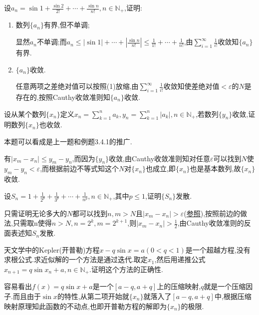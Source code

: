 \documentclass[cn,chinese,fontset]{elegantbook}
\begin{document}
      \begin{exercise}
          设$a_n=\sin1+\frac{\sin2}{2!}+\cdots+\frac{\sin n}{n!},n\in \mathbb{N}_+$,证明:
          \begin{enumerate}
              \item 数列$\{a_n\}$有界,但不单调;
                    \begin{solution}
                        显然$a_n$不单调;而$a_n\leqslant\left|\sin1\right|+\cdots+\left|\frac{\sin n}{n!}\right|\leqslant\frac{1}{1!}+\cdots+\frac{1}{n!}$,由$\sum_{i=1}^\infty\frac{1}{i!}$收敛知$\{a_n\}$有界.
                    \end{solution}\item $\{a_n\}$收敛.
                    \begin{solution}
                        任意两项之差绝对值可以按照(1)放缩,由$\sum_{i=1}^\infty\frac{1}{i!}$收敛知使差绝对值$<\varepsilon$的$N$是存在的,按照Cauthy收敛准则知$\{a_n\}$收敛.
                    \end{solution}
          \end{enumerate}
      \end{exercise}

      \begin{exercise}
          设从某个数列$\{x_n\}$定义$x_n=\sum_{k=1}^na_k,y_n=\sum_{k=1}^n\left|a_k\right|,n\in \mathbb{N}_+$,若数列$\{y_n\}$收敛,证明数列$\{x_n\}$也收敛.
          \begin{note}
              本题可以看成是上一题和例题3.4.1的推广.
          \end{note}
      \end{exercise}
      \begin{solution}
          有$\left|x_m-x_n\right|\leqslant y_m-y_n$,而因为$\{y_n\}$收敛,由Cauthy收敛准则知对任意$\varepsilon$可以找到$N$使$y_m-y_n<\varepsilon$,而根据前边不等式知这个$N$对$\{x_n\}$也成立,即$\{x_n\}$也是基本数列,故$\{x_n\}$收敛.
      \end{solution}

      \begin{exercise}
          设$S_n=1+\frac{1}{2^p}+\frac{1}{3^p}+\cdots+\frac{1}{n^p},n\in \mathbb{N}_+$,其中$p\leqslant 1$,证明$\{S_n\}$发散.
      \end{exercise}
      \begin{solution}
          只需证明无论多大的$N$都可以找到$n,m>N$且$\left|x_m-x_n\right|>\varepsilon$(\hyperlink{2.4.p.2}{参照}),按照前边的做法,只需取n使得$n>N,n=2^k,m=2^{k+1}$,则$\left|x_m-x_n\right|>\frac{1}{2}$,由Cauthy收敛准则的反面表述知$S_n$发散.
      \end{solution}

      \begin{exercise}
          天文学中的Kepler(开普勒)方程$x-q\sin x=a(0<q<1)$是一个超越方程,没有求根公式.求近似解的一个方法是通过迭代.取定$x_1$,然后用递推公式$x_{n+1}=q\sin x_n+a,n\in \mathbb{N}_+$.证明这个方法的正确性.
      \end{exercise}
      \begin{solution}
          容易看出$f(x)=q\sin x+a$是一个$[a-q,a+q]$上的压缩映射,$q$就是一个压缩因子.而且由于$\sin x$的特性,从第二项开始就$\{x_n\}$就落入了$[a-q,a+q]$中,根据压缩映射原理知此函数的不动点,也即开普勒方程的解即为$\{x_n\}$的极限.
      \end{solution}
\end{document}
